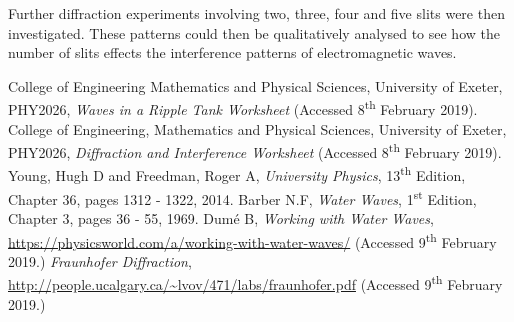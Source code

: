 \documentclass{article}
\begin{document}
\vspace{2mm}
\noindent
Further diffraction experiments involving two, three, four and five slits were then investigated. These patterns could then be qualitatively analysed to see how the number of slits effects the interference patterns of electromagnetic waves.












\begin{thebibliography}{9}
 College of Engineering Mathematics and Physical Sciences, University of Exeter, PHY2026, \textit{Waves in a Ripple Tank Worksheet} (Accessed 8\textsuperscript{th} February 2019).
 College of Engineering, Mathematics and Physical Sciences, University of Exeter, PHY2026, \textit{Diffraction and Interference Worksheet} (Accessed 8\textsuperscript{th} February 2019).
 Young, Hugh D and Freedman, Roger A, \textit{University Physics}, 13\textsuperscript{th} Edition, Chapter 36, pages 1312 - 1322, 2014.
 Barber N.F, \textit{Water Waves}, 1\textsuperscript{st} Edition, Chapter 3, pages 36 - 55, 1969. 
 Dum\'e B, \textit{Working with Water Waves}, \url{https://physicsworld.com/a/working-with-water-waves/} (Accessed 9\textsuperscript{th} February 2019.)
 \textit{Fraunhofer Diffraction}, \url{http://people.ucalgary.ca/~lvov/471/labs/fraunhofer.pdf} (Accessed 9\textsuperscript{th} February 2019.)

\end{thebibliography}
\end{document}
